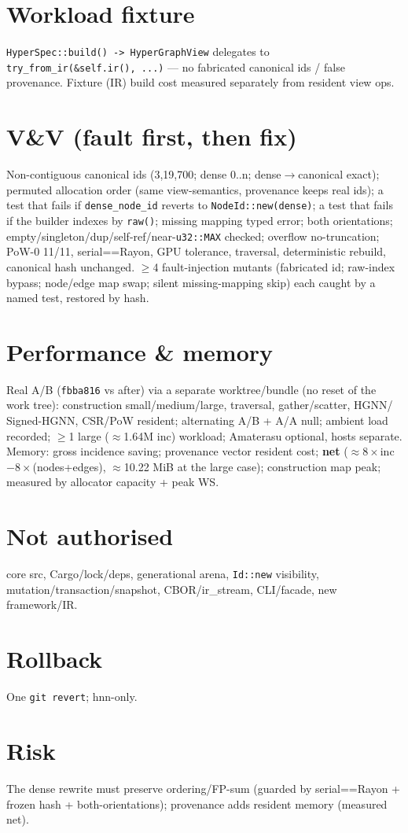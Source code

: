 \documentclass[11pt]{article}
\begin{document}
\section{Workload fixture}
\texttt{HyperSpec::build() -> HyperGraphView} delegates to
\texttt{try\_from\_ir(\&self.ir(), ...)} --- no fabricated canonical ids / false
provenance. Fixture (IR) build cost measured separately from resident view ops.
\section{V\&V (fault first, then fix)}
Non-contiguous canonical ids (3,19,700; dense 0..n; dense$\to$canonical exact);
permuted allocation order (same view-semantics, provenance keeps real ids); a test
that fails if \texttt{dense\_node\_id} reverts to \texttt{NodeId::new(dense)}; a test
that fails if the builder indexes by \texttt{raw()}; missing mapping typed error;
both orientations; empty/singleton/dup/self-ref/near-\texttt{u32::MAX} checked;
overflow no-truncation; PoW-0 11/11, serial==Rayon, GPU tolerance, traversal,
deterministic rebuild, canonical hash unchanged. $\ge$4 fault-injection mutants
(fabricated id; raw-index bypass; node/edge map swap; silent missing-mapping skip)
each caught by a named test, restored by hash.
\section{Performance \& memory}
Real A/B (\texttt{fbba816} vs after) via a separate worktree/bundle (no reset of the
work tree): construction small/medium/large, traversal, gather/scatter, HGNN/
Signed-HGNN, CSR/PoW resident; alternating A/B + A/A null; ambient load recorded;
$\ge$1 large ($\approx$1.64M inc) workload; Amaterasu optional, hosts separate.
Memory: gross incidence saving; provenance vector resident cost; \textbf{net}
($\approx 8\times$inc $- 8\times$(nodes+edges), $\approx$10.22 MiB at the large case);
construction map peak; measured by allocator capacity + peak WS.
\section{Not authorised}
core src, Cargo/lock/deps, generational arena, \texttt{Id::new} visibility,
mutation/transaction/snapshot, CBOR/ir\_stream, CLI/facade, new framework/IR.
\section{Rollback} One \texttt{git revert}; hnn-only. \section{Risk} The dense
rewrite must preserve ordering/FP-sum (guarded by serial==Rayon + frozen hash +
both-orientations); provenance adds resident memory (measured net).
\end{document}
